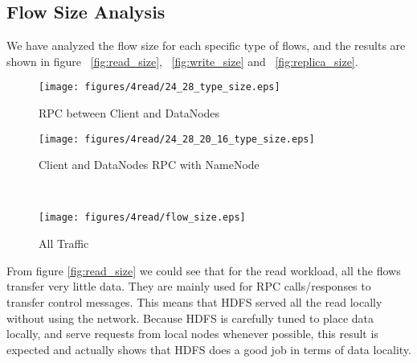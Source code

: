 \subsection{\bf Flow Size Analysis}
We have analyzed the flow size for each specific type of flows, and the results are shown in figure ~\ref{fig:read_size}, ~\ref{fig:write_size} and ~\ref{fig:replica_size}.




\begin{figure*}
\centering
  \begin{subfigure}[b]{.45\linewidth}
   \centering
	\texttt{[image: figures/4read/24\_28\_type\_size.eps]} 
	\caption{RPC between Client and DataNodes}\label{fig:read_size:rpc}
   \end{subfigure}%
  \begin{subfigure}[b]{.45\linewidth}
   \centering
	\texttt{[image: figures/4read/24\_28\_20\_16\_type\_size.eps]} 
	\caption{Client and DataNodes RPC with NameNode}\label{fig:read_size:nn_rpc}
   \end{subfigure} \\%
  \begin{subfigure}[b]{.55\linewidth}
   \centering
	\texttt{[image: figures/4read/flow\_size.eps]}
	\caption{All Traffic}\label{fig:read_size:all}
   \end{subfigure}%
\caption{Read Flow Size Distribution}
\label{fig:read_size}
\end{figure*}

From figure \ref{fig:read_size} we could see that for the read workload, all the flows transfer very little data. They are mainly used for RPC calls/responses to transfer control messages. This means that HDFS served all the read locally without using the network. Because HDFS is carefully tuned to place data locally, and serve requests from local nodes whenever possible, this result is expected and actually shows that HDFS does a good job in terms of data locality.

